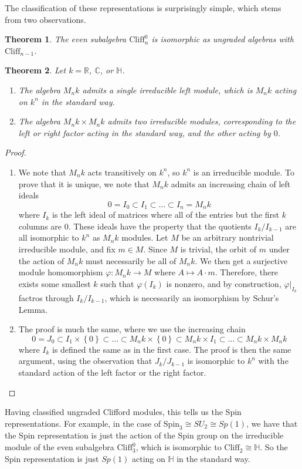 \documentclass[psamsfonts, 12pt]{amsart}
\newtheorem{thm}{Theorem}[section]
\theoremstyle{definition}
\theoremstyle{remark}
\newcommand{\R}{\mathbb{R}}
\renewcommand{\H}{\mathbb{H}}
\newcommand{\C}{\mathbb{C}}
\newcommand{\Cliff}{\mathrm{Cliff}}
\newcommand{\Spin}{\mathrm{Spin}}
\newcommand{\set}[1]{\left\lbrace #1 \right\rbrace}
\newcommand{\enumbreak}{\ \\ \vspace{-\baselineskip}}
\begin{document}
%
The classification of these representations is surprisingly simple, which stems
from two observations.
%
\begin{thm}
The even subalgebra $\Cliff^0_n$ is isomorphic as ungraded algebras with $\Cliff_{n-1}$.
\end{thm}
%
\begin{thm}
Let $k = \R$, $\C$, or $\H$.
\begin{enumerate}
  \item The algebra $M_nk$ admits a single irreducible left
  module, which is $M_nk$ acting on $k^n$ in the standard way.
  \item The algebra $M_nk \times M_nk$ admits two irreducible modules, corresponding
  to the left or right factor acting in the standard way, and the other acting by $0$.
\end{enumerate}
\end{thm}
%
\begin{proof} \enumbreak
\begin{enumerate}
  \item We note that $M_nk$ acts transitively on $k^n$, so $k^n$ is an irreducible module. To
  prove that it is unique, we note that $M_nk$ admits an increasing chain of left ideals
  \[
  0 = I_0 \subset I_1 \subset \ldots \subset I_n = M_nk
  \]
  where $I_k$ is the left ideal of matrices where all of the entries but the first $k$ columns
  are $0$. These ideals have the property that the quotients $I_k/I_{k-1}$ are all isomorphic
  to $k^n$ as $M_nk$ modules. Let $M$ be an arbitrary nontrivial irreducible module, and fix
  $m \in M$. Since $M$ is trivial, the orbit of $m$ under the action of $M_nk$ must necessarily
  be all of $M_nk$. We then get a surjective module homomorphism $\varphi : M_nk \to M$
  where $A \mapsto A\cdot m$. Therefore, there exists some smallest $k$ such that $\varphi(I_k)$
  is nonzero, and by construction, $\varphi\vert_{I_k}$ factros through $I_k/I_{k-1}$, which
  is necessarily an isomorphism by Schur's Lemma.
  \item The proof is much the same, where we use the increasing chain
  \[
  0 = J_0 \subset I_1 \times \set{0} \subset \ldots \subset M_nk \times \set{0} \subset M_nk
  \times I_1 \subset \ldots \subset M_nk \times M_nk
  \]
  where $I_k$ is defined the same as in the first case. The proof is then the same argument,
  using the observation that $J_k/J_{k-1}$ is isomorphic to $k^n$ with the standard action
  of the left factor or the right factor.
\end{enumerate}
\end{proof}
%
Having classified ungraded Clifford modules, this tells us the Spin representations. For
example, in the case of $\Spin_3 \cong SU_2 \cong Sp(1)$, we have that the Spin representation
is just the action of the Spin group on the irreducible module of the even subalgebra
$\Cliff_3^0$, which is isomorphic to $\Cliff_2 \cong \H$. So the Spin representation is just
$Sp(1)$ acting on $\H$ in the standard way. \\
\end{document}
